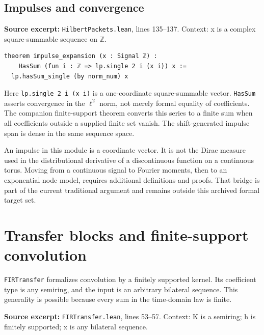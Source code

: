 \documentclass[11pt]{article}
\begin{document}
\hypertarget{impulses-and-convergence}{%
\subsection{Impulses and convergence}\label{impulses-and-convergence}}

\textbf{Source excerpt:} \texttt{HilbertPackets.lean}, lines 135--137. Context: x is a complex square-summable sequence on \ensuremath{\mathbb Z}.

\begin{minipage}{\linewidth}
\begin{lstlisting}
theorem impulse_expansion (x : Signal ℤ) :
    HasSum (fun i : ℤ => lp.single 2 i (x i)) x :=
  lp.hasSum_single (by norm_num) x
\end{lstlisting}
\end{minipage}\par

Here \texttt{lp.single 2 i (x i)} is a one-coordinate square-summable vector. \texttt{HasSum} asserts convergence in the \(\ell^2\) norm, not merely formal equality of coefficients. The companion finite-support theorem converts this series to a finite sum when all coefficients outside a supplied finite set vanish. The shift-generated impulse span is dense in the same sequence space.

An impulse in this module is a coordinate vector. It is not the Dirac measure used in the distributional derivative of a discontinuous function on a continuous torus. Moving from a continuous signal to Fourier moments, then to an exponential node model, requires additional definitions and proofs. That bridge is part of the current traditional argument and remains outside this archived formal target set.

\hypertarget{transfer-blocks-and-finite-support-convolution}{%
\section{Transfer blocks and finite-support convolution}\label{transfer-blocks-and-finite-support-convolution}}

\texttt{FIRTransfer} formalizes convolution by a finitely supported kernel. Its coefficient type is any semiring, and the input is an arbitrary bilateral sequence. This generality is possible because every sum in the time-domain law is finite.

\textbf{Source excerpt:} \texttt{FIRTransfer.lean}, lines 53--57. Context: K is a semiring; h is finitely supported; x is any bilateral sequence.
\end{document}
